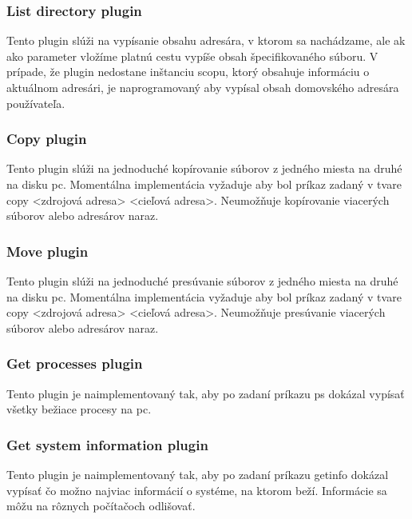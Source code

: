 \subsubsection{List directory plugin}
\indent  Tento plugin slúži na vypísanie obsahu adresára, v ktorom sa nachádzame, ale ak ako parameter vložíme platnú cestu vypíše obsah špecifikovaného súboru. V prípade, že plugin nedostane inštanciu scopu, ktorý obsahuje informáciu o aktuálnom adresári, je naprogramovaný aby vypísal obsah domovského adresára používateľa.
\subsubsection{Copy plugin}
\indent  Tento plugin slúži na jednoduché kopírovanie súborov z jedného miesta na druhé na disku \acrshort{pc}. Momentálna implementácia vyžaduje aby bol príkaz zadaný v tvare copy <zdrojová adresa> <cieľová adresa>. Neumožňuje kopírovanie viacerých súborov alebo adresárov naraz.
\subsubsection{Move plugin}
\indent  Tento plugin slúži na jednoduché presúvanie súborov z jedného miesta na druhé na disku \acrshort{pc}. Momentálna implementácia vyžaduje aby bol príkaz zadaný v tvare copy <zdrojová adresa> <cieľová adresa>. Neumožňuje presúvanie viacerých súborov alebo adresárov naraz.
\subsubsection{Get processes plugin}
\indent Tento plugin je naimplementovaný tak, aby po zadaní príkazu ps dokázal vypísať všetky bežiace procesy na \acrshort{pc}.
\subsubsection{Get system information plugin}
\indent Tento plugin je naimplementovaný tak, aby po zadaní príkazu getinfo dokázal vypísať čo možno najviac informácií o systéme, na ktorom beží. Informácie sa môžu na rôznych počítačoch odlišovať.
